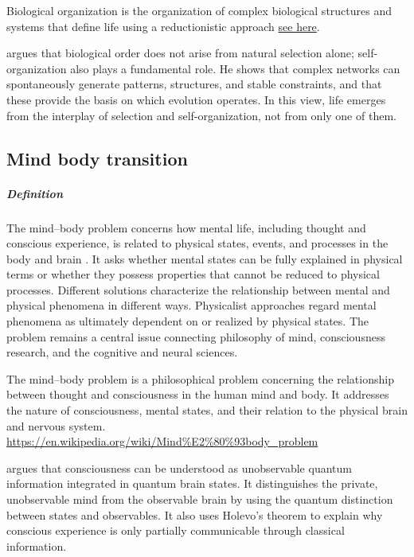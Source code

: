 \documentclass{book}
\newcommand{\seehere}[1]{\href{#1}{see here}}
\providecommand{\seehere}[1]{\href{#1}{see here}}
\begin{document}
    Biological organization is the organization of complex biological structures and systems that define life using a reductionistic approach \seehere{https://en.wikipedia.org/wiki/Biological_organisation}.
    
    
    
    \cite{kauffman-1993-the-origins-of-order-self-organization-and-selection-in-evolution} argues that biological order does not arise from natural selection alone; self-organization also plays a fundamental role.
    He shows that complex networks can spontaneously generate patterns, structures, and stable constraints, and that these provide the basis on which evolution operates.
    In this view, life emerges from the interplay of selection and self-organization, not from only one of them.

\subsection{Mind body transition}


\subparagraph{Definition}
    
    
    The mind--body problem concerns how mental life, including thought and conscious experience, is related to physical states, events, and processes in the body and brain \cite{chambliss-2018-the-mind-body-problem}. It asks whether mental states can be fully explained in physical terms or whether they possess properties that cannot be reduced to physical processes. Different solutions characterize the relationship between mental and physical phenomena in different ways. Physicalist approaches regard mental phenomena as ultimately dependent on or realized by physical states. The problem remains a central issue connecting philosophy of mind, consciousness research, and the cognitive and neural sciences.
    
    The mind–body problem is a philosophical problem concerning the relationship between thought and consciousness in the human mind and body. It addresses the nature of consciousness, mental states, and their relation to the physical brain and nervous system.
    \url{https://en.wikipedia.org/wiki/Mind%E2%80%93body_problem}
    
    \cite{georgiev-2020-quantum-information-theoretic-approach-to-the-mind-brain-problem}  argues that consciousness can be understood as unobservable quantum information integrated in quantum brain states. It distinguishes the private, unobservable mind from the observable brain by using the quantum distinction between states and observables. It also uses Holevo’s theorem to explain why conscious experience is only partially communicable through classical information.
\end{document}
